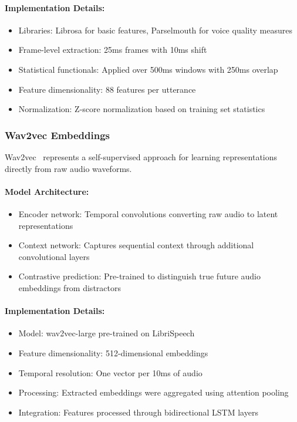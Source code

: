 \documentclass[12pt]{article}
\begin{document}
\paragraph{Implementation Details:}
\begin{itemize}
    \item Libraries: Librosa for basic features, Parselmouth for voice quality measures
    \item Frame-level extraction: 25ms frames with 10ms shift
    \item Statistical functionals: Applied over 500ms windows with 250ms overlap
    \item Feature dimensionality: 88 features per utterance
    \item Normalization: Z-score normalization based on training set statistics
\end{itemize}

\subsubsection{Wav2vec Embeddings}
Wav2vec~\cite{schneider2019wav2vec} represents a self-supervised approach for learning representations directly from raw audio waveforms.

\paragraph{Model Architecture:}
\begin{itemize}
    \item Encoder network: Temporal convolutions converting raw audio to latent representations
    \item Context network: Captures sequential context through additional convolutional layers
    \item Contrastive prediction: Pre-trained to distinguish true future audio embeddings from distractors
\end{itemize}

\paragraph{Implementation Details:}
\begin{itemize}
    \item Model: wav2vec-large pre-trained on LibriSpeech
    \item Feature dimensionality: 512-dimensional embeddings
    \item Temporal resolution: One vector per 10ms of audio
    \item Processing: Extracted embeddings were aggregated using attention pooling
    \item Integration: Features processed through bidirectional LSTM layers
\end{itemize}
\end{document}
